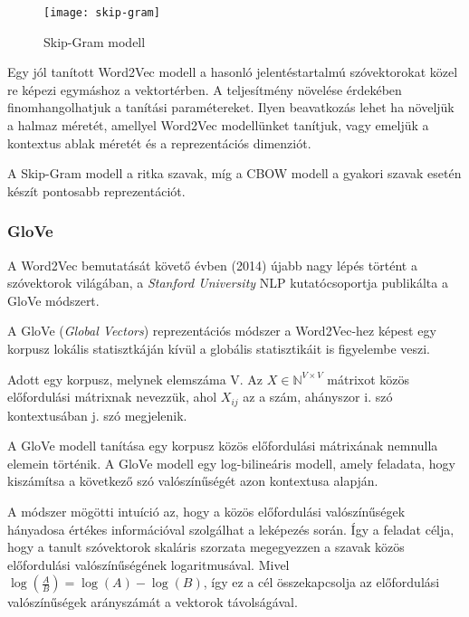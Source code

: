 \begin{figure}[H]
	\centering
	\texttt{[image: skip-gram]}
	\caption{Skip-Gram modell}
\end{figure}

Egy jól tanított Word2Vec modell a hasonló jelentéstartalmú szóvektorokat közel re képezi egymáshoz a vektortérben. 
A teljesítmény növelése érdekében finomhangolhatjuk a tanítási paramétereket. Ilyen beavatkozás lehet ha növeljük a halmaz méretét, amellyel Word2Vec modellünket tanítjuk, vagy emeljük a kontextus ablak méretét és a reprezentációs dimenziót.

\begin{note}
	A Skip-Gram modell a ritka szavak, míg a CBOW modell a gyakori szavak esetén készít pontosabb reprezentációt.
\end{note}


\subsubsection{GloVe}
A Word2Vec bemutatását követő évben (2014) újabb nagy lépés történt a szóvektorok világában, a \textit{Stanford University} NLP kutatócsoportja publikálta a GloVe módszert.

A GloVe (\textit{Global Vectors}) reprezentációs módszer a Word2Vec-hez képest egy korpusz lokális statisztkáján kívül a globális statisztikáit is figyelembe veszi. 

\begin{definition}
	Adott egy korpusz, melynek elemszáma V. Az $X \in \mathbb{N}^{V \times V}$ mátrixot közös előfordulási mátrixnak nevezzük, ahol $X_{ij}$ az a szám, ahányszor i. szó kontextusában j. szó megjelenik.  
\end{definition}

A GloVe modell tanítása egy korpusz közös előfordulási mátrixának nemnulla elemein történik. A GloVe modell egy log-bilineáris modell, amely feladata, hogy kiszámítsa a következő szó valószínűségét azon kontextusa alapján.

A módszer mögötti intuíció az, hogy a közös előfordulási valószínűségek hányadosa értékes információval szolgálhat a leképezés során. Így a feladat célja, hogy a tanult szóvektorok skaláris szorzata megegyezzen a szavak közös előfordulási valószínűségének logaritmusával. Mivel $\log \left( \frac{A}{B} \right) = \log \left( A \right) - \log \left( B \right)$, így ez a cél összekapcsolja az előfordulási valószínűségek arányszámát a vektorok távolságával.

